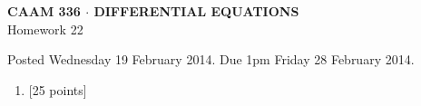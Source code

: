 \documentclass[10pt]{article}
\begin{document}
\vspace*{-5em}
\begin{center}
\large \textsf{\textbf{CAAM 336 $\cdot$ DIFFERENTIAL EQUATIONS}\\[0.5em]
Homework 22 }
\end{center}

Posted Wednesday 19 February 2014.  Due 1pm Friday 28 February 2014.

\begin{enumerate}\addtocounter{enumi}{21}
\item {[25 points]}  
\end{enumerate}
\end{document}
